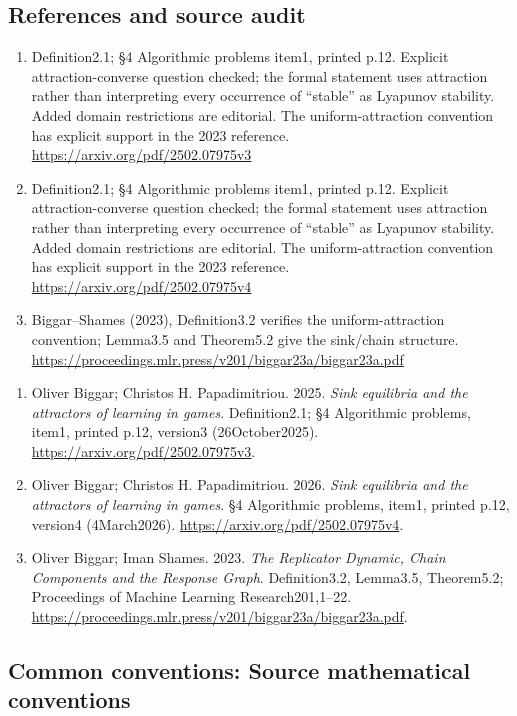 \documentclass[11pt,a4paper]{article}
\begin{document}
\subsection*{References and source audit}
\begin{enumerate}
\item Definition2.1; §4 Algorithmic problems item1, printed p.12. Explicit attraction-converse question checked; the formal statement uses attraction rather than interpreting every occurrence of ``stable'' as Lyapunov stability. Added domain restrictions are editorial. The uniform-attraction convention has explicit support in the 2023 reference. \url{https://arxiv.org/pdf/2502.07975v3}
\item Definition2.1; §4 Algorithmic problems item1, printed p.12. Explicit attraction-converse question checked; the formal statement uses attraction rather than interpreting every occurrence of ``stable'' as Lyapunov stability. Added domain restrictions are editorial. The uniform-attraction convention has explicit support in the 2023 reference. \url{https://arxiv.org/pdf/2502.07975v4}
\item Biggar--Shames (2023), Definition3.2 verifies the uniform-attraction convention; Lemma3.5 and Theorem5.2 give the sink/chain structure. \url{https://proceedings.mlr.press/v201/biggar23a/biggar23a.pdf}
\end{enumerate}
\begin{enumerate}\raggedright
\item\hypertarget{definitions:source:30007566:1}{} Oliver Biggar; Christos H. Papadimitriou. 2025. \emph{Sink equilibria and the attractors of learning in games}. Definition2.1; §4 Algorithmic problems, item1, printed p.12, version3 (26October2025).
\url{https://arxiv.org/pdf/2502.07975v3}.
\item\hypertarget{definitions:source:30007566:2}{} Oliver Biggar; Christos H. Papadimitriou. 2026. \emph{Sink equilibria and the attractors of learning in games}. §4 Algorithmic problems, item1, printed p.12, version4 (4March2026).
\url{https://arxiv.org/pdf/2502.07975v4}.
\item\hypertarget{definitions:source:30007566:3}{} Oliver Biggar; Iman Shames. 2023. \emph{The Replicator Dynamic, Chain Components and the Response Graph}. Definition3.2, Lemma3.5, Theorem5.2; Proceedings of Machine Learning Research201,1–22.
\url{https://proceedings.mlr.press/v201/biggar23a/biggar23a.pdf}.
\end{enumerate}

\subsection*{Common conventions: Source mathematical conventions}
\end{document}
